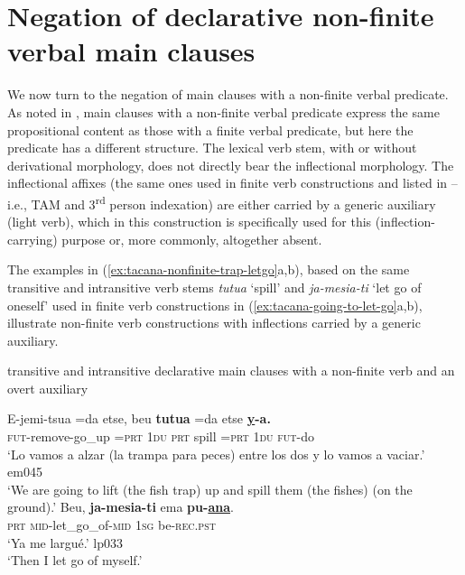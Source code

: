 \documentclass[output=paper,draft,draftmode,colorlinks,citecolor=brown]{langscibook}
\begin{document}
\section{Negation of declarative non-finite verbal main clauses}\label{sec:tacana-6}

We now turn to the negation of main clauses with a non-finite verbal
predicate. As noted in , main clauses with a
non-finite verbal predicate express the same propositional content as those
with a finite verbal predicate, but here the predicate has a different
structure. The lexical verb stem, with or without derivational morphology,
does not directly bear the inflectional morphology. The inflectional
affixes (the same ones used in finite verb constructions and listed in
 -- i.e., TAM and 3\textsuperscript{rd}
person indexation) are
either carried by a generic auxiliary (light verb), which in this
construction is specifically used for this (inflection-carrying) purpose
or, more commonly, altogether absent.

The examples in (\ref{ex:tacana-nonfinite-trap-letgo}a,b), based on the
same transitive and intransitive verb stems \textit{tutua} `spill' and
\textit{ja-mesia-ti} `let go of oneself' used in finite verb constructions
in (\ref{ex:tacana-going-to-let-go}a,b), illustrate non-finite verb
constructions with inflections carried by a generic auxiliary.

\newpage
\begin{exe}
\ex \label{ex:tacana-nonfinite-trap-letgo}
transitive and
intransitive declarative main clauses with a non-finite verb and an overt
auxiliary \\
\begin{xlist}
\ex\label{ex:tacana-nonfinite-trap}
\gll   E-jemi-tsua   =da  etse,  beu
\textbf{tutua} =da etse \textbf{\uline{y}-a.}\\
    \textsc{fut}-remove-go\_up  \textsc{=prt}  \textsc{1du}      \textsc{prt}  spill  =\textsc{prt}  \textsc{1du}  \textsc{fut-}do\\
\glt `Lo vamos a alzar (la trampa para peces) entre los dos y lo vamos a vaciar.' em045\\
`We are going to lift (the fish trap) up and spill them (the fishes) (on the ground).'
\ex\label{ex:tacana-nonfinite-letgo}
\gll  Beu, \textbf{ja-mesia-ti} ema \textbf{pu-\uline{ana}}.\\
    \textsc{prt}  \textsc{mid-}let\_go\_of-\textsc{mid}  \textsc{1sg}     be\textsc{-rec.pst}\\
\glt `Ya me largué.' lp033\\
`Then I let go of myself.'
\end{xlist}
\end{exe}
\end{document}
